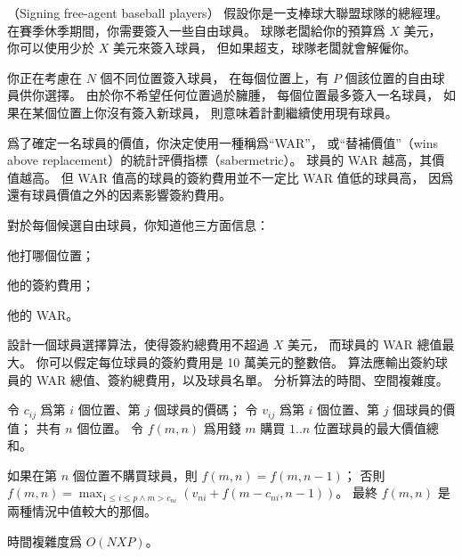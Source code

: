 \startPROBLEM
（Signing free-agent baseball players）
假設你是一支棒球大聯盟球隊的總經理。
在賽季休季期間，你需要簽入一些自由球員。
球隊老闆給你的預算爲 $X$ 美元，
你可以使用少於 $X$ 美元來簽入球員，
但如果超支，球隊老闆就會解僱你。

你正在考慮在 $N$ 個不同位置簽入球員，
在每個位置上，有 $P$ 個該位置的自由球員供你選擇。
由於你不希望任何位置過於臃腫，
每個位置最多簽入一名球員，
如果在某個位置上你沒有簽入新球員，
則意味着計劃繼續使用現有球員。

爲了確定一名球員的價值，你決定使用一種稱爲“WAR”，
或“替補價值”（wins above replacement）的統計評價指標（sabermetric）。
球員的 WAR 越高，其價值越高。
但 WAR 值高的球員的簽約費用並不一定比 WAR 值低的球員高，
因爲還有球員價值之外的因素影響簽約費用。

對於每個候選自由球員，你知道他三方面信息：
\startigBase
\item 他打哪個位置；
\item 他的簽約費用；
\item 他的 WAR。
\stopigBase

設計一個球員選擇算法，使得簽約總費用不超過 $X$ 美元，
而球員的 WAR 總值最大。
你可以假定每位球員的簽約費用是 10 萬美元的整數倍。
算法應輸出簽約球員的 WAR 總值、簽約總費用，以及球員名單。
分析算法的時間、空間複雜度。
\stopPROBLEM

\startANSWER
令 $c_{ij}$ 爲第 $i$ 個位置、第 $j$ 個球員的價碼；
令 $v_{ij}$ 爲第 $i$ 個位置、第 $j$ 個球員的價值；
共有 $n$ 個位置。
令 $f(m,n)$ 爲用錢 $m$ 購買 $1..n$ 位置球員的最大價值總和。

如果在第 $n$ 個位置不購買球員，則 $f(m,n)=f(m,n-1)$；
否則 $f(m,n) = \max_{1\le i\le p \land m > c_{ni}}(v_{ni} + f(m-c_{ni},n-1))$。
最終 $f(m,n)$ 是兩種情況中值較大的那個。

時間複雜度爲 $O(NXP)$。
\stopANSWER
